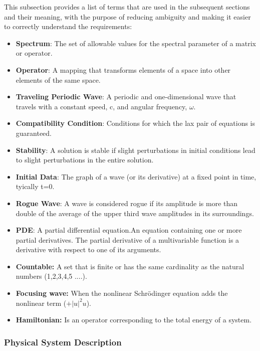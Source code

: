 \documentclass[12pt]{article}
\begin{document}
This subsection provides a list of terms that are used in the subsequent
sections and their meaning, with the purpose of reducing ambiguity and making it
easier to correctly understand the requirements:

\begin{itemize}

\item \textbf{Spectrum}: The set of allowable values for the spectral parameter 
of a matrix or operator.
\item \textbf{Operator}: A mapping that transforms elements of a space into 
other elements of the same space. 
\item \textbf{Traveling Periodic Wave}: A periodic and one-dimensional wave 
that travels with a constant speed, c, and angular frequency, $\omega$. 
\item \textbf{Compatibility Condition}: Conditions for which the lax pair of 
equations is guaranteed. 
\item \textbf{Stability}: A solution is stable if slight perturbations in 
initial conditions lead 
to slight perturbations in the entire solution.
\item \textbf{Initial Data}: The graph of a wave (or its derivative) 
at a fixed point in time, tyically t=0.
\item \textbf{Rogue Wave}: A wave is considered rogue if its amplitude is more 
than double of the average of the upper third wave amplitudes in its 
surroundings. 
\item \textbf{PDE}: A partial differential equation.An equation containing one 
or more partial derivatives. The partial derivative of a multivariable function 
is a derivative with respect to one of its arguments. 
\item \textbf{Countable:} A set that is finite or has the same cardinality as 
the natural numbers (1,2,3,4,5 ....). 
\item \textbf{Focusing wave:} When the nonlinear Schr\"{o}dinger equation adds 
the 
nonlinear term ($+|u|^{2}u$).  
\item \textbf{Hamiltonian:} Is an operator corresponding to the total energy of 
a system. 

\end{itemize}

\subsubsection{Physical System Description}
\end{document}

